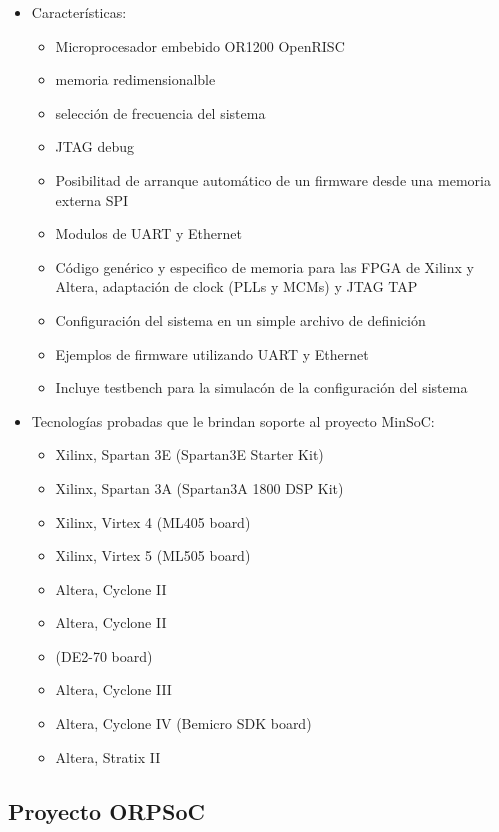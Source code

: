 \begin{itemize}
\item Características:
				\begin{itemize}
				  \item Microprocesador embebido OR1200 OpenRISC 
				  \item memoria redimensionalble
				  \item selección de frecuencia del sistema
				  \item JTAG debug 
				  \item Posibilitad de arranque automático de un firmware desde una memoria externa SPI
				  \item Modulos de UART y Ethernet 
				  \item Código genérico y especifico de memoria para las FPGA de Xilinx y Altera, adaptación de clock (PLLs y MCMs) y JTAG TAP
				  \item Configuración del sistema en un simple archivo de definición 
				  \item Ejemplos de firmware utilizando UART y Ethernet  
				  \item Incluye testbench para la simulacón de la configuración del sistema						
				\end{itemize}

\item Tecnologías probadas que le brindan soporte al proyecto MinSoC:


\begin{itemize}
				  \item Xilinx, Spartan 3E (Spartan3E Starter Kit)
				  \item Xilinx, Spartan 3A (Spartan3A 1800 DSP Kit)
				  \item Xilinx, Virtex 4 (ML405 board)
				  \item Xilinx, Virtex 5 (ML505 board)
				  \item Altera, Cyclone II
				  \item Altera, Cyclone II
				  \item (DE2-70 board)
				  \item Altera, Cyclone III
				  \item Altera, Cyclone IV (Bemicro SDK board) 
				  \item Altera, Stratix II						
				\end{itemize}
\end{itemize}

				\subsection{Proyecto ORPSoC}


